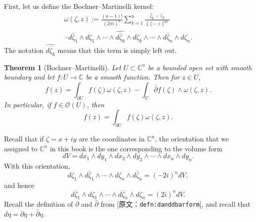 \documentclass[UTF8,11pt]{ctexart}
\newtheorem*{thm}{Theorem}
\theoremstyle{definition}
\newcommand{\C}{\mathbb C}
\newcommand{\sO}{\mathscr O}
\newcommand{\widebar}[1]{\overline{#1}}
\newcommand{\sourceref}[1]{\textnormal{[原文：\nolinkurl{#1}]}}
\newcommand{\defnref}[1]{\sourceref{#1}}
\begin{document}
First, let us define the Bochner--Martinelli kernel:
\begin{multline*}
\omega(\zeta,z):=\frac{(n-1)!}{(2\pi i)^n}\sum_{k=1}^n\frac{\bar\zeta_k-\bar z_k}{\|\zeta-z\|^{2n}}\\
{}\cdot d\bar\zeta_1\wedge d\zeta_1\wedge\cdots\wedge\widehat{d\bar\zeta_k}\wedge d\zeta_k\wedge\cdots\wedge d\bar\zeta_n\wedge d\zeta_n.
\end{multline*}
The notation $\widehat{d\bar\zeta_k}$ means that this term is simply left out.
\begin{thm}[Bochner--Martinelli]
Let $U\subset\C^n$ be a bounded open set with smooth boundary and let $f:\widebar U\to\C$ be a smooth function. Then for $z\in U$,
\[f(z)=\int_{\partial U}f(\zeta)\omega(\zeta,z)-\int_U\bar\partial f(\zeta)\wedge\omega(\zeta,z).\]
In particular, if $f\in\sO(U)$, then
\[f(z)=\int_{\partial U}f(\zeta)\omega(\zeta,z).\]
\end{thm}
Recall that if $\zeta=x+iy$ are the coordinates in $\C^n$, the orientation that we assigned to $\C^n$ in this book is the one corresponding to the volume form
\[dV=dx_1\wedge dy_1\wedge dx_2\wedge dy_2\wedge\cdots\wedge dx_n\wedge dy_n.\]
With this orientation,
\[d\zeta_1\wedge d\bar\zeta_1\wedge\cdots\wedge d\zeta_n\wedge d\bar\zeta_n=(-2i)^n dV,\]
and hence
\[d\bar\zeta_1\wedge d\zeta_1\wedge\cdots\wedge d\bar\zeta_n\wedge d\zeta_n=(2i)^n dV.\]
Recall the definition of $\partial$ and $\bar\partial$ from \defnref{defn:danddbarform}, and recall that $d\eta=\partial\eta+\bar\partial\eta$.
\end{document}
